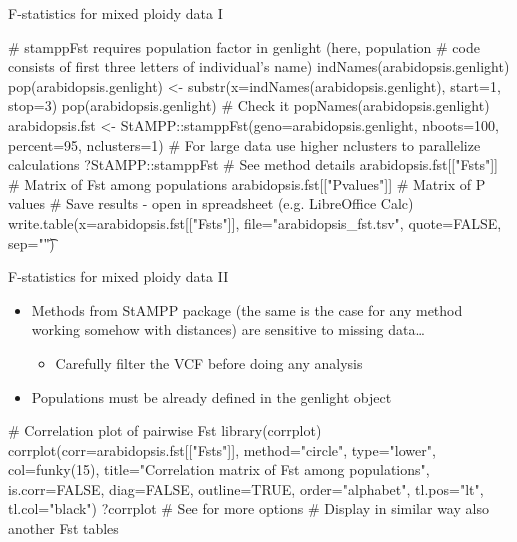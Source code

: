 \documentclass[compress, ucs, xelatex, 11pt, xcolor=svgnames, aspectratio=169,
	hyperref={
		bookmarks=true,
		unicode=true,
		colorlinks=true,
		pdftitle={Molecular data in R},
		plainpages=false,
		pdfauthor={Vojtech Zeisek},
		pdfsubject={Course about phylogeny and evolution in R},
		pdfcreator={XeLaTeX},
		pdfkeywords={R, evolution, phylogeny, molecular data},
		linkcolor=Crimson, %
		anchorcolor=Magenta, %
		citecolor=Magenta, %
		filecolor=Magenta, %
		menucolor=Magenta, %
		urlcolor=DodgerBlue, %
		pdftex},
	url={hyphens, lowtilde} %
	]{beamer}
\begin{document}
\begin{frame}[fragile]{F-statistics for mixed ploidy data I}
	\begin{spluscode}
    # stamppFst requires population factor in genlight (here, population
    # code consists of first three letters of individual's name)
    indNames(arabidopsis.genlight)
    pop(arabidopsis.genlight) <- substr(x=indNames(arabidopsis.genlight),
      start=1, stop=3)
    pop(arabidopsis.genlight) # Check it
    popNames(arabidopsis.genlight)
    arabidopsis.fst <- StAMPP::stamppFst(geno=arabidopsis.genlight,
      nboots=100, percent=95, nclusters=1)
    # For large data use higher nclusters to parallelize calculations
    ?StAMPP::stamppFst # See method details
    arabidopsis.fst[["Fsts"]] # Matrix of Fst among populations
    arabidopsis.fst[["Pvalues"]] # Matrix of P values
    # Save results - open in spreadsheet (e.g. LibreOffice Calc)
    write.table(x=arabidopsis.fst[["Fsts"]], file="arabidopsis_fst.tsv",
      quote=FALSE, sep="\t")
	\end{spluscode}
\end{frame}

\begin{frame}[fragile]{F-statistics for mixed ploidy data II}
	\begin{itemize}
		\item Methods from StAMPP package (the same is the case for any method working somehow with distances) are sensitive to missing data\ldots
		\begin{itemize}
			\item Carefully filter the VCF before doing any analysis
		\end{itemize}
		\item Populations must be already defined in the genlight object
	\end{itemize}
	\begin{spluscode}
    # Correlation plot of pairwise Fst
    library(corrplot)
    corrplot(corr=arabidopsis.fst[["Fsts"]], method="circle", type="lower",
      col=funky(15), title="Correlation matrix of Fst among populations",
      is.corr=FALSE, diag=FALSE, outline=TRUE, order="alphabet", tl.pos="lt",
      tl.col="black")
    ?corrplot # See for more options
    # Display in similar way also another Fst tables
	\end{spluscode}
\end{frame}

\end{document}
